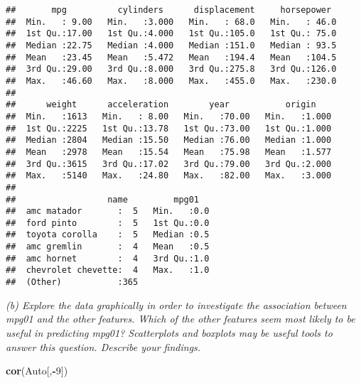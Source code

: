 \documentclass[]{article}
\newenvironment{Shaded}{\begin{snugshade}}{\end{snugshade}}
\newcommand{\KeywordTok}[1]{\textcolor[rgb]{0.13,0.29,0.53}{\textbf{#1}}}
\newcommand{\DecValTok}[1]{\textcolor[rgb]{0.00,0.00,0.81}{#1}}
\newcommand{\OperatorTok}[1]{\textcolor[rgb]{0.81,0.36,0.00}{\textbf{#1}}}
\newcommand{\NormalTok}[1]{#1}
\begin{document}
\begin{verbatim}
##       mpg          cylinders      displacement     horsepower   
##  Min.   : 9.00   Min.   :3.000   Min.   : 68.0   Min.   : 46.0  
##  1st Qu.:17.00   1st Qu.:4.000   1st Qu.:105.0   1st Qu.: 75.0  
##  Median :22.75   Median :4.000   Median :151.0   Median : 93.5  
##  Mean   :23.45   Mean   :5.472   Mean   :194.4   Mean   :104.5  
##  3rd Qu.:29.00   3rd Qu.:8.000   3rd Qu.:275.8   3rd Qu.:126.0  
##  Max.   :46.60   Max.   :8.000   Max.   :455.0   Max.   :230.0  
##                                                                 
##      weight      acceleration        year           origin     
##  Min.   :1613   Min.   : 8.00   Min.   :70.00   Min.   :1.000  
##  1st Qu.:2225   1st Qu.:13.78   1st Qu.:73.00   1st Qu.:1.000  
##  Median :2804   Median :15.50   Median :76.00   Median :1.000  
##  Mean   :2978   Mean   :15.54   Mean   :75.98   Mean   :1.577  
##  3rd Qu.:3615   3rd Qu.:17.02   3rd Qu.:79.00   3rd Qu.:2.000  
##  Max.   :5140   Max.   :24.80   Max.   :82.00   Max.   :3.000  
##                                                                
##                  name         mpg01    
##  amc matador       :  5   Min.   :0.0  
##  ford pinto        :  5   1st Qu.:0.0  
##  toyota corolla    :  5   Median :0.5  
##  amc gremlin       :  4   Mean   :0.5  
##  amc hornet        :  4   3rd Qu.:1.0  
##  chevrolet chevette:  4   Max.   :1.0  
##  (Other)           :365
\end{verbatim}

 \emph{(b) Explore the data graphically in order to investigate the
association between mpg01 and the other features. Which of the other
features seem most likely to be useful in predicting mpg01? Scatterplots
and boxplots may be useful tools to answer this question. Describe your
findings. }

\begin{Shaded}
\begin{Highlighting}[]
\KeywordTok{cor}\NormalTok{(Auto[,}\OperatorTok{-}\DecValTok{9}\NormalTok{])}
\end{Highlighting}
\end{Shaded}
\end{document}
